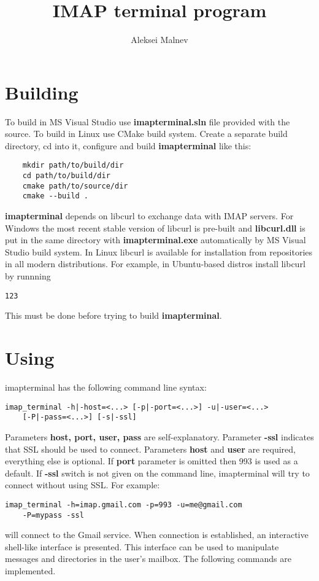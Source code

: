\documentclass[titlepage]{article}
\title{IMAP terminal program}
\author{Aleksei Malnev}
\begin{document}
\section{Building}
To build in MS Visual Studio use \textbf{imap\textunderscore terminal.sln} file provided with the source. 
To build in Linux use CMake build system. Create a separate build directory, cd into it,
configure and build \textbf{imap\textunderscore terminal} like this:
\begin{lstlisting}
	mkdir path/to/build/dir
	cd path/to/build/dir
	cmake path/to/source/dir
	cmake --build .
\end{lstlisting}
\textbf{imap\textunderscore terminal} depends on libcurl to exchange data with IMAP servers.
For Windows the most recent stable version of libcurl is pre-built and \textbf{libcurl.dll} is 
put in the same directory with \textbf{imap\textunderscore terminal.exe} automatically by 
MS Visual Studio build system. In Linux
libcurl is available for installation from repositories in all modern distributions. For example,
in Ubuntu-based distros install libcurl by runnning
\begin{lstlisting}
123
\end{lstlisting}
This must be done before trying to build \textbf{imap\textunderscore terminal}.

\section{Using}
imap\textunderscore terminal has the following command line syntax:
\begin{lstlisting}
imap_terminal -h|-host=<...> [-p|-port=<...>] -u|-user=<...> 
	[-P|-pass=<...>] [-s|-ssl]
\end{lstlisting}
Parameters \textbf{host, port, user, pass} are self-explanatory. Parameter \textbf{-ssl}  indicates
that SSL should be used to connect. Parameters \textbf{host} and \textbf{user} are required, 
everything else is optional. If \textbf{port} parameter is omitted then 993 is used as a default. If
\textbf{-ssl} switch is not given on the command line, imap\textunderscore terminal will try to connect
without using SSL. For example:
\begin{lstlisting}
imap_terminal -h=imap.gmail.com -p=993 -u=me@gmail.com 
	-P=mypass -ssl
\end{lstlisting}
will connect to the Gmail service. When connection is established, an interactive shell-like interface
is presented. This interface can be used to manipulate messages and directories in the user's mailbox.
The following commands are implemented.
\end{document}
